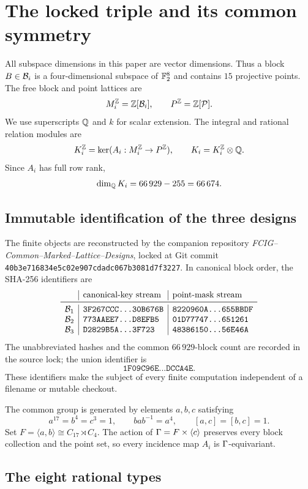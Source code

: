 \section{The locked triple and its common symmetry}
\label{sec:locked}

All subspace dimensions in this paper are vector dimensions.  Thus a
block \(B\in\mathcal B_i\) is a four-dimensional subspace of \(\mathbb F_2^8\) and
contains \(15\) projective points.  The free block and point lattices are
\[
  M_i^{\mathbb Z}=\mathbb Z[\mathcal B_i],
  \qquad
  P^{\mathbb Z}=\mathbb Z[\mathcal P].
\]
We use superscripts \(\mathbb Q\) and \(k\) for scalar extension.  The integral
and rational relation modules are
\[
  K_i^{\mathbb Z}=\ker(A_i:M_i^{\mathbb Z}\to P^{\mathbb Z}),
  \qquad
  K_i=K_i^{\mathbb Z}\otimes\mathbb Q.
\]
Since \(A_i\) has full row rank,
\[
 \dim_{\mathbb Q}K_i=66\,929-255=66\,674.
\]

\subsection{Immutable identification of the three designs}

The finite objects are reconstructed by the companion repository
\emph{FCIG--Common--Marked--Lattice--Designs}, locked at Git commit
\texttt{40b3e716834e5c02e907cdadc067b3081d7f3227}.  In canonical block
order, the SHA-256 identifiers are
\[
\begin{array}{c|l|l}
 &\text{canonical-key stream}&\text{point-mask stream}\\
\midrule
\cB_1&
\texttt{3F267CCC...30B676B}&
\texttt{8220960A...655BBDF}\\
\cB_2&
\texttt{773AAEE7...D8EFB5}&
\texttt{01D77747...651261}\\
\cB_3&
\texttt{D2829B5A...3F723}&
\texttt{48386150...56E46A}
\end{array}
\]
The unabbreviated hashes and the common \(66\,929\)-block count are recorded
in the source lock; the union identifier is
\[
\texttt{1F09C96E...DCCA4E}.
\]
These identifiers make the subject of every finite computation independent of
a filename or mutable checkout.

The common group is generated by elements \(a,b,c\) satisfying
\[
 a^{17}=b^4=c^3=1,\qquad bab^{-1}=a^4,
 \qquad [a,c]=[b,c]=1.
\]
Set \(F=\langle a,b\rangle\cong C_{17}\rtimes C_4\).  The action of
\(\Gamma=F\times\langle c\rangle\) preserves every block collection and
the point set, so every incidence map \(A_i\) is
\(\Gamma\)-equivariant.

\subsection{The eight rational types}

